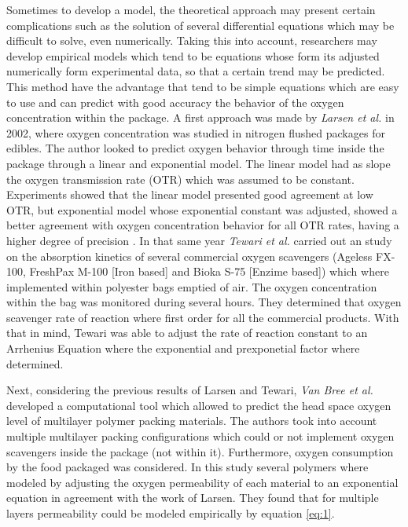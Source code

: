 \begin{refsection}
Sometimes to develop a model, the theoretical approach may present certain  complications such as the solution of several differential equations which may be difficult to solve, even numerically. Taking this into account, researchers may develop empirical models which tend to be equations whose form its adjusted numerically form experimental data, so that a certain trend may be predicted. This method have the advantage that tend to be simple equations which are easy to use and can predict with good accuracy the behavior of the oxygen concentration within the package. A first approach was made by \textit{Larsen et al.} \cite{Larsen2002PredictingMethod} in 2002, where oxygen concentration was studied in nitrogen flushed packages for edibles. The author looked to predict oxygen behavior through time inside the package through a linear and exponential model. The linear model had as slope the oxygen transmission rate (OTR) which was assumed to be constant. Experiments showed that the linear model presented  good agreement at low OTR, but exponential model whose exponential constant was adjusted, showed a better agreement with oxygen concentration behavior for all OTR rates, having a higher degree of precision \cite{Larsen2002PredictingMethod}. In that same year \textit{Tewari et al.} \cite{Tewari2002AbsorptionScavengers} carried out an study on the absorption kinetics of several commercial oxygen scavengers (Ageless\textsuperscript{\tiny\textregistered} FX-100, FreshPax\textsuperscript{\tiny\textregistered} M-100 [Iron based] and Bioka\textsuperscript{\tiny\textregistered} S-75 [Enzime based]) which where implemented within polyester bags emptied of air. The oxygen concentration within the bag was monitored during several hours. They determined that oxygen scavenger rate of reaction where first order for all the commercial products. With that in mind, Tewari was able to adjust the rate of reaction constant to an Arrhenius Equation where the exponential and prexponetial factor where determined.

Next, considering the previous results of Larsen and Tewari, \textit{Van Bree et al.} \cite{VanBree2010PredictingTool} developed a computational tool which allowed to predict the head space oxygen level of multilayer polymer packing materials. The authors took into account multiple multilayer packing configurations which could or not implement oxygen scavengers inside the package (not within it). Furthermore, oxygen consumption by the food packaged was considered. In this study several polymers where modeled by adjusting the oxygen permeability of each material to an exponential equation in agreement with the work of Larsen. They found that for multiple layers permeability could be modeled empirically by equation \ref{eq:1}.


\end{refsection}

